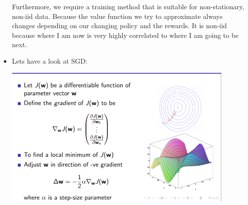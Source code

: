 \documentclass[a4paper]{article}
\begin{document}
\begin{itemize}
    \newline
    Furthermore, we require a training method that is suitable for non-stationary, non-iid data. Because the value function we try to approximate always changes depending on our changing policy and the rewards. It is non-iid because where I am now is very highly correlated to where I am going to be next. 
    \item Lets have a look at SGD: 
    \begin{center}
    \includegraphics[width = \textwidth, height=7cm]{images/sgd.png}
    \end{center}
    

\end{itemize}
\end{document}
